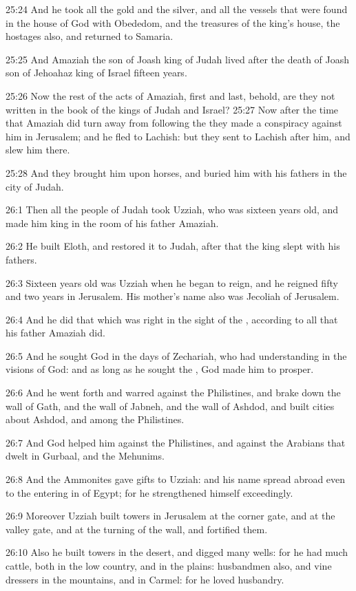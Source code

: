25:24 And he took all the gold and the silver, and all the vessels that were found in the house of God with Obededom, and the treasures of the king's house, the hostages also, and returned to Samaria.

25:25 And Amaziah the son of Joash king of Judah lived after the death of Joash son of Jehoahaz king of Israel fifteen years.

25:26 Now the rest of the acts of Amaziah, first and last, behold, are they not written in the book of the kings of Judah and Israel?  25:27 Now after the time that Amaziah did turn away from following the \LORD they made a conspiracy against him in Jerusalem; and he fled to Lachish: but they sent to Lachish after him, and slew him there.

25:28 And they brought him upon horses, and buried him with his fathers in the city of Judah.

26:1 Then all the people of Judah took Uzziah, who was sixteen years old, and made him king in the room of his father Amaziah.

26:2 He built Eloth, and restored it to Judah, after that the king slept with his fathers.

26:3 Sixteen years old was Uzziah when he began to reign, and he reigned fifty and two years in Jerusalem. His mother's name also was Jecoliah of Jerusalem.

26:4 And he did that which was right in the sight of the \LORD, according to all that his father Amaziah did.

26:5 And he sought God in the days of Zechariah, who had understanding in the visions of God: and as long as he sought the \LORD, God made him to prosper.

26:6 And he went forth and warred against the Philistines, and brake down the wall of Gath, and the wall of Jabneh, and the wall of Ashdod, and built cities about Ashdod, and among the Philistines.

26:7 And God helped him against the Philistines, and against the Arabians that dwelt in Gurbaal, and the Mehunims.

26:8 And the Ammonites gave gifts to Uzziah: and his name spread abroad even to the entering in of Egypt; for he strengthened himself exceedingly.

26:9 Moreover Uzziah built towers in Jerusalem at the corner gate, and at the valley gate, and at the turning of the wall, and fortified them.

26:10 Also he built towers in the desert, and digged many wells: for he had much cattle, both in the low country, and in the plains: husbandmen also, and vine dressers in the mountains, and in Carmel: for he loved husbandry.

